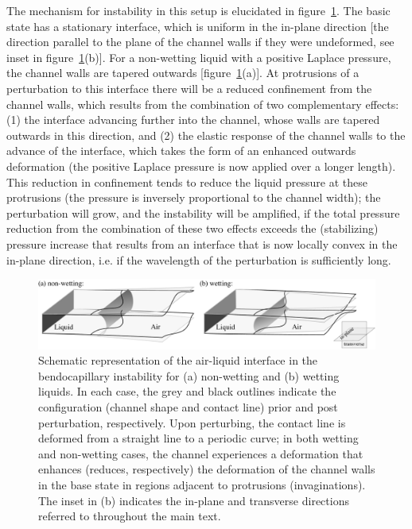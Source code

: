 \documentclass{jfm}
\begin{document}
The mechanism for instability in this setup is elucidated in figure~\ref{fig:mechanism_schematic}. The basic state has a stationary interface, which is uniform in the in-plane direction [the direction parallel to the plane of the channel walls if they were undeformed, see inset in figure~\ref{fig:mechanism_schematic}(b)]. For a non-wetting liquid with a positive Laplace pressure, the channel walls are tapered outwards [figure~\ref{fig:mechanism_schematic}(a)]. At protrusions of a perturbation to this interface there will be a reduced confinement from the channel walls, which results from the combination of two complementary effects: (1) the interface advancing further into the channel, whose walls are tapered outwards in this direction, and (2) the elastic response of the channel walls to the advance of the interface, which takes the form of an enhanced outwards deformation (the positive Laplace pressure is now applied over a longer length). This reduction in confinement tends to reduce the liquid pressure at these protrusions (the pressure is inversely proportional to the channel width); the perturbation will grow, and the instability will be amplified, if the total pressure reduction from the combination of these two effects exceeds the (stabilizing) pressure increase that results from an interface that is now locally convex in the in-plane direction, i.e. if the wavelength of the perturbation is sufficiently long.

\begin{figure}
    \centering
    \includegraphics[width=\textwidth]{figures/fig2_mechanism_schematic.pdf}
    \caption{Schematic representation of the air-liquid interface in the bendocapillary instability for (a) non-wetting and (b) wetting liquids. In each case, the grey and black outlines indicate the configuration (channel shape and contact line) prior and post perturbation, respectively. Upon perturbing, the contact line is deformed from a straight line to a periodic curve; in both wetting and non-wetting cases, the channel experiences a deformation that enhances (reduces, respectively) the deformation of the channel walls in the base state in regions adjacent to protrusions (invaginations). The inset in (b) indicates the in-plane and transverse directions referred to throughout the main text. }
    \label{fig:mechanism_schematic}
\end{figure}
\end{document}
